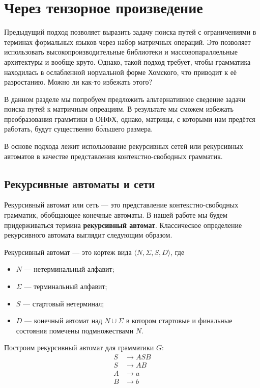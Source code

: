 \section{Через тензорное произведение}

Предыдущий подход позволяет выразить задачу поиска путей с ограничениями в терминах формальных языков через набор матричных операций.
Это позволяет использовать высокопроизводительные библиотеки и массовопараллельные архитектуры и вообще круто.
Однако, такой подход требует, чтобы грамматика находилась в ослабленной нормальной форме Хомского, что приводит к её разростанию.
Можно ли как-то избежать этого?

В данном разделе мы попробуем предложить альтернативное сведение задачи поиска путей к матричным опреациям.
В результате мы сможем избежать преобразования граммтики в ОНФХ, однако, матрицы, с которыми нам предётся работать, будут существенно б\'{о}льшего размера.

В основе подхода лежит использование рекурсивных сетей или рекурсивных автоматов в качестве представления контекстно-свободных грамматик.

\subsection{Рекурсивные автоматы и сети}

Рекурсивный автомат или сеть --- это представление контекстно-свободных грамматик, обобщающее конечные автоматы.
В нашей работе мы будем придерживаться термина \textbf{рекурсивный автомат}. 
Классическое определение рекурсивного автомата выглядит следующим образом.

\begin{definition}
Рекурсивный автомат --- это кортеж вида $\langle N, \Sigma, S, D \rangle$, где
\begin{itemize}
\item $N$ --- нетерминальный алфавит;
\item $\Sigma$ --- терминальный алфавит;
\item $S$ --- стартовый нетерминал;
\item $D$ --- конечный автомат над $N \cup \Sigma$ в котором стартовые и финальные состояния помечены подмножествами $N$.
\end{itemize}
\end{definition}



Построим рекурсивный автомат для грамматики $G$:
\begin{align*}
S   &\to    A S B \\ 
S   &\to    A B \\
A   &\to    a \\
B   &\to    b
\end{align*}


